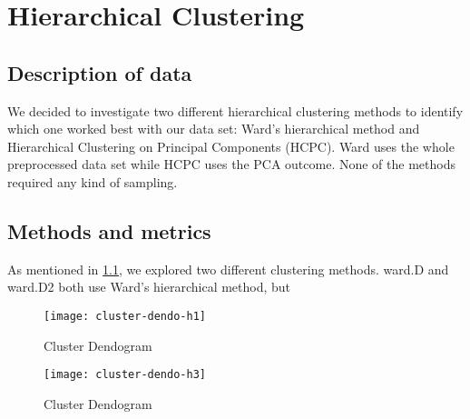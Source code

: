 

\section{Hierarchical Clustering}%
\label{sec:hierarchical_clustering}

\subsection{Description of data}%
\label{sub:description_data}


We decided to investigate two different hierarchical clustering methods to
identify which one worked best with our data set: Ward's hierarchical method and 
Hierarchical Clustering on Principal Components (HCPC). Ward uses
the whole preprocessed data set while HCPC uses the PCA outcome. None of the
methods required any kind of sampling.

\subsection{Methods and metrics}


As mentioned in \ref{sub:description_data}, we explored two different clustering methods.
ward.D and ward.D2 both use Ward's hierarchical method, but 


\begin{figure}[H]
    \centering
    \texttt{[image: cluster-dendo-h1]}
    \caption{Cluster Dendogram}%
    \label{fig:dendogram}
\end{figure}

\begin{figure}[H]
    \centering
    \texttt{[image: cluster-dendo-h3]}
    \caption{Cluster Dendogram}%
    \label{fig:dendogram}
\end{figure}

